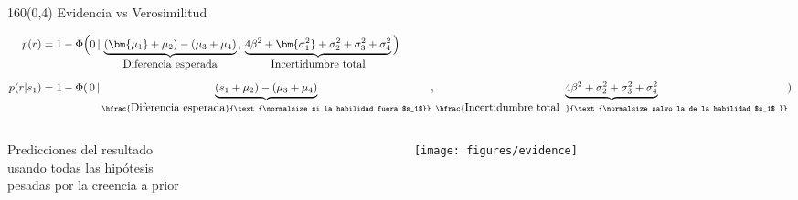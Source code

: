 \documentclass[shownotes,aspectratio=169]{beamer}
\begin{document}
\begin{frame}[plain]

\end{frame}

\begin{frame}[plain]
\begin{textblock}{160}(0,4)
\centering \Large Evidencia vs Verosimilitud
\end{textblock}
\vspace{1.5cm}

\begin{align*}
p(r) & =  1 - \Phi\Big(0 \, | \, \underbrace{(\bm{\mu_1} + \mu_2) - (\mu_3 + \mu_4)}_{\text{\normalsize Diferencia esperada}} \, , \, \underbrace{4\beta^2 + \bm{\sigma_1^2}  + \sigma_2^2  + \sigma_3^2  + \sigma_4^2}_{\text{\normalsize Incertidumbre total}}\Big) \\[0.2cm]
 p(r|s_1) & =  1 - \Phi(\, 0\,| \underbrace{(s_1+\mu_2) - (\mu_3 + \mu_4)}_{\hfrac{\text{\normalsize Diferencia esperada}}{\text{\normalsize si la habilidad fuera $s_1$}}} , \underbrace{4\beta^2 +  \sigma_2^2 + \sigma_3^2 + \sigma_4^2}_{\hfrac{\text{\normalsize Incertidumbre total\phantom{p}}}{\text{\normalsize salvo la de la habilidad $s_1$ }}})
\end{align*}
 
\vspace{0.3cm}



\begin{columns}[c]
\begin{column}{0.5\textwidth}
 \flushright Predicciones del resultado \\ 
 usando todas las hipótesis \\
 pesadas por la creencia a prior \\
 \vspace{0.8cm}
 \end{column}
 \begin{column}{0.5\textwidth}
\texttt{[image: figures/evidence]} 

\end{column}
\end{columns}

 
 
\end{frame}
\end{document}
